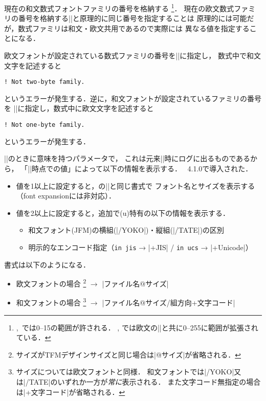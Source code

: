 \documentclass[a4paper,11pt,nomag,dvipdfmx]{jsarticle}
\begin{document}
\begin{cslist}
\csitem[\.{jfam}=<number>]
  現在の和文数式フォントファミリの番号を格納する
  \footnote{\pTeX,~\upTeX では0--15の範囲が許される．
  \epTeX, \eupTeX では欧文の|\fam|と共に0--255に範囲が拡張されている．}．
  現在の欧文数式ファミリの番号を格納する|\fam|と原理的に同じ番号を指定することは
  原理的には可能だが，数式ファミリは和文・欧文共用であるので実際には
  異なる値を指定することになる．

  欧文フォントが設定されている数式ファミリの番号を|\jfam|に指定し，
  数式中で和文文字を記述すると
\begin{verbatim}
! Not two-byte family.
\end{verbatim}
  というエラーが発生する．逆に，和文フォントが設定されているファミリの番号を
  |\fam|に指定し，数式中に欧文文字を記述すると
\begin{verbatim}
! Not one-byte family.
\end{verbatim}
  というエラーが発生する．

  ||のときに意味を持つパラメータで，
  これは元来|\shipout|時にログに出るものであるから，
  「|\shipout|時点での値」によって以下の情報を表示する．
  \pTeX~4.1.0で導入された．
 \begin{itemize}
  \item 値を1以上に設定すると，\pdfTeX の|\pdftracingfonts|と同じ書式で
   フォント名とサイズを表示する（font expansionには非対応）．
  \item 値を2以上に設定すると，追加で(u)\pTeX 特有の以下の情報を表示する．
   \begin{itemize}
    \item 和文フォント(JFM)の横組(|/YOKO|)・縦組(|/TATE|)の区別
    \item 明示的なエンコード指定（\verb+in jis+ → |+JIS| / \verb+in ucs+ → |+Unicode|）
   \end{itemize}
 \end{itemize}
  書式は以下のようになる．
 \begin{itemize}
  \item 欧文フォントの場合
    \footnote{サイズがTFMデザインサイズと同じ場合は|@サイズ|が省略される．}
    $\rightarrow$ |ファイル名@サイズ|
  \item 和文フォントの場合
    \footnote{サイズについては欧文フォントと同様．
      和文フォントでは|/YOKO|又は|/TATE|のいずれか一方が\emph{常に}表示される．
      また文字コード無指定の場合は|+文字コード|が省略される．}
    $\rightarrow$ |ファイル名@サイズ/組方向+文字コード|
 \end{itemize}


\end{cslist}
\end{document}
